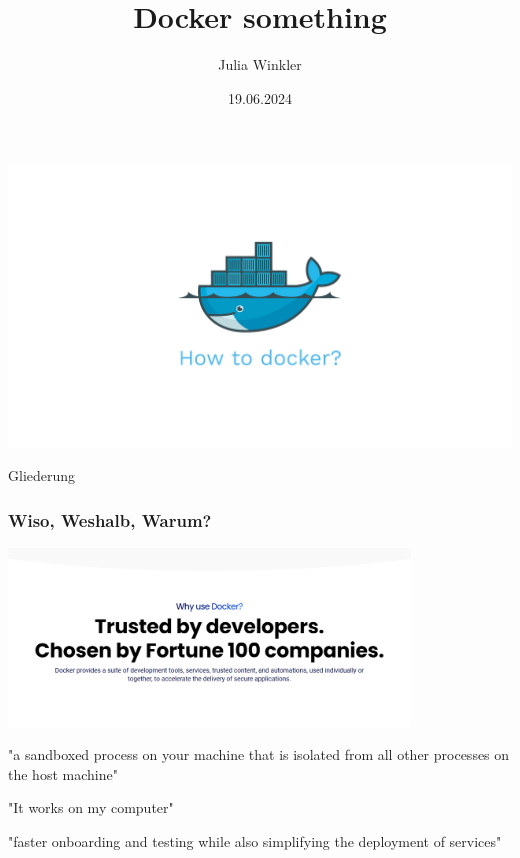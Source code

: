 \documentclass[22pt,handout]{beamer}
\title{Docker something}
\author{Julia Winkler}
\date{19.06.2024}
\begin{document}

\begin{frame}[t]
    \vfill
    \begin{center}
        \includegraphics[width=1\textwidth]{Bilder/docker-how.png}
    \end{center}
    \vfill
\end{frame}

\maketitle

\begin{frame}{Gliederung}
    \tableofcontents
\end{frame}

\begin{frame}
    \frametitle{Wiso, Weshalb, Warum?}
    \begin{center}
        \includegraphics[width=0.8\textwidth]{Bilder/docker-why.png}
    \end{center}\pause
    \begin{center}
        "a sandboxed process on your machine that is isolated from all other processes on the host machine"
    \end{center}\pause
    \begin{center}
        "It works on my computer"
    \end{center}\pause
    \begin{center}
        "faster onboarding and testing while also simplifying the deployment of services"
    \end{center}
\end{frame}
\end{document}
